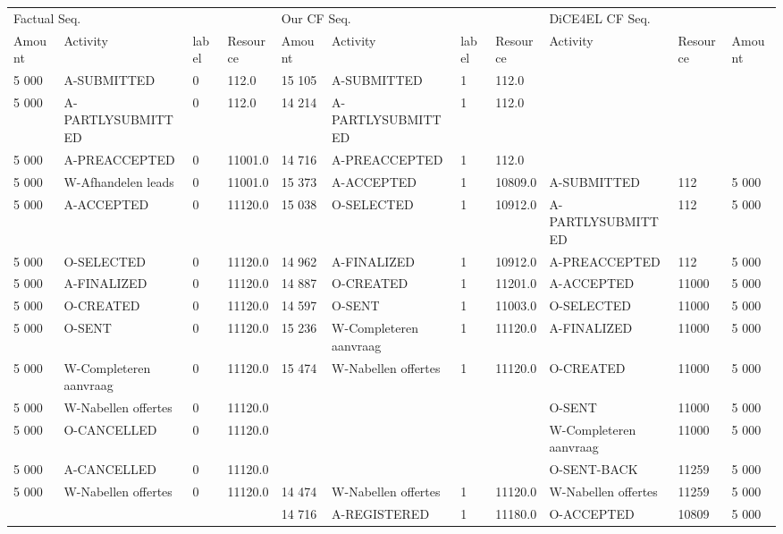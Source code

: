 \begin{tabular}{lllllllllll}
\toprule
\multicolumn{4}{l}{Factual Seq.} & \multicolumn{4}{l}{Our CF Seq.} & \multicolumn{3}{l}{DiCE4EL CF Seq.} \\
Amount & Activity & label & Resource & Amount & Activity & label & Resource & Activity & Resource & Amount \\
\midrule
5 000 & A-SUBMITTED & 0 & 112.0 & 15 105 & A-SUBMITTED & 1 & 112.0 &  &  &  \\
5 000 & A-PARTLYSUBMITTED & 0 & 112.0 & 14 214 & A-PARTLYSUBMITTED & 1 & 112.0 &  &  &  \\
5 000 & A-PREACCEPTED & 0 & 11001.0 & 14 716 & A-PREACCEPTED & 1 & 112.0 &  &  &  \\
5 000 & W-Afhandelen leads & 0 & 11001.0 & 15 373 & A-ACCEPTED & 1 & 10809.0 & A-SUBMITTED & 112 & 5 000 \\
5 000 & A-ACCEPTED & 0 & 11120.0 & 15 038 & O-SELECTED & 1 & 10912.0 & A-PARTLYSUBMITTED & 112 & 5 000 \\
5 000 & O-SELECTED & 0 & 11120.0 & 14 962 & A-FINALIZED & 1 & 10912.0 & A-PREACCEPTED & 112 & 5 000 \\
5 000 & A-FINALIZED & 0 & 11120.0 & 14 887 & O-CREATED & 1 & 11201.0 & A-ACCEPTED & 11000 & 5 000 \\
5 000 & O-CREATED & 0 & 11120.0 & 14 597 & O-SENT & 1 & 11003.0 & O-SELECTED & 11000 & 5 000 \\
5 000 & O-SENT & 0 & 11120.0 & 15 236 & W-Completeren aanvraag & 1 & 11120.0 & A-FINALIZED & 11000 & 5 000 \\
5 000 & W-Completeren aanvraag & 0 & 11120.0 & 15 474 & W-Nabellen offertes & 1 & 11120.0 & O-CREATED & 11000 & 5 000 \\
5 000 & W-Nabellen offertes & 0 & 11120.0 &  &  &  &  & O-SENT & 11000 & 5 000 \\
5 000 & O-CANCELLED & 0 & 11120.0 &  &  &  &  & W-Completeren aanvraag & 11000 & 5 000 \\
5 000 & A-CANCELLED & 0 & 11120.0 &  &  &  &  & O-SENT-BACK & 11259 & 5 000 \\
5 000 & W-Nabellen offertes & 0 & 11120.0 & 14 474 & W-Nabellen offertes & 1 & 11120.0 & W-Nabellen offertes & 11259 & 5 000 \\
 &  &  &  & 14 716 & A-REGISTERED & 1 & 11180.0 & O-ACCEPTED & 10809 & 5 000 \\
\bottomrule
\end{tabular}
